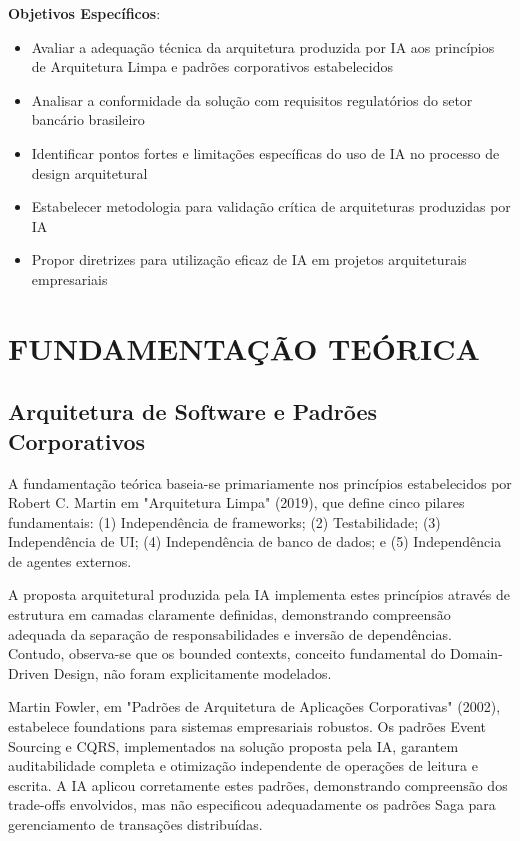 \textbf{Objetivos Específicos}:

\begin{itemize}
\item Avaliar a adequação técnica da arquitetura produzida por IA aos princípios de Arquitetura Limpa e padrões corporativos estabelecidos
\item Analisar a conformidade da solução com requisitos regulatórios do setor bancário brasileiro
\item Identificar pontos fortes e limitações específicas do uso de IA no processo de design arquitetural
\item Estabelecer metodologia para validação crítica de arquiteturas produzidas por IA
\item Propor diretrizes para utilização eficaz de IA em projetos arquiteturais empresariais
\end{itemize}

\chapter{FUNDAMENTAÇÃO TEÓRICA}

\section{Arquitetura de Software e Padrões Corporativos}

A fundamentação teórica baseia-se primariamente nos princípios estabelecidos por Robert C. Martin em "Arquitetura Limpa" (2019), que define cinco pilares fundamentais: (1) Independência de frameworks; (2) Testabilidade; (3) Independência de UI; (4) Independência de banco de dados; e (5) Independência de agentes externos.

A proposta arquitetural produzida pela IA implementa estes princípios através de estrutura em camadas claramente definidas, demonstrando compreensão adequada da separação de responsabilidades e inversão de dependências. Contudo, observa-se que os bounded contexts, conceito fundamental do Domain-Driven Design, não foram explicitamente modelados.

Martin Fowler, em "Padrões de Arquitetura de Aplicações Corporativas" (2002), estabelece foundations para sistemas empresariais robustos. Os padrões Event Sourcing e CQRS, implementados na solução proposta pela IA, garantem auditabilidade completa e otimização independente de operações de leitura e escrita. A IA aplicou corretamente estes padrões, demonstrando compreensão dos trade-offs envolvidos, mas não especificou adequadamente os padrões Saga para gerenciamento de transações distribuídas.

